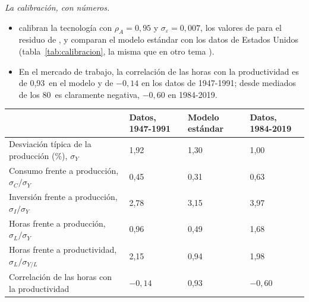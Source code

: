 \documentclass[11pt]{article}
\begin{document}
\begin{anotaciones}
\emph{La calibración, con números.}
\begin{itemize}
\item \textcite{HansenWright1992Labor} calibran la tecnología con $\rho_A=0{,}95$ y $\sigma_\varepsilon=0{,}007$, los valores de \textcite{Prescott1986} para el residuo de , y comparan el modelo estándar con los datos de Estados Unidos (tabla~\ref{tab:calibracion}, la misma que en otro tema ).
\item En el mercado de trabajo, la correlación de las horas con la productividad es de 0,93~en el modelo y de $-0{,}14$ en los datos de 1947-1991; desde mediados de los 80~es claramente negativa, $-0{,}60$ en 1984-2019\nocite{FRED2026CicloEEUU}.
\end{itemize}
\begin{tablacaja}
\caption{El ciclo de Estados Unidos y el modelo de ciclo real estándar}\label{tab:calibracion}
\small
\begin{tabular}{>{\raggedright\arraybackslash}m{5.6cm}>{\centering\arraybackslash}m{2.6cm}>{\centering\arraybackslash}m{2.3cm}>{\centering\arraybackslash}m{2.6cm}}
\toprule
\rowcolor{tceeazulpalido} & \textcolor{tceemorado}{\textbf{Datos, 1947-1991}} & \textcolor{tceeverde}{\textbf{Modelo estándar}} & \textcolor{tceeazul}{\textbf{Datos, 1984-2019}}\\
\midrule
Desviación típica de la producción (\%), $\sigma_Y$ & \textcolor{tceemorado}{1,92} & \textcolor{tceeverde}{1,30} & \textcolor{tceeazul}{1,00}\\
Consumo frente a producción, $\sigma_C/\sigma_Y$ & \textcolor{tceemorado}{0,45} & \textcolor{tceeverde}{0,31} & \textcolor{tceeazul}{0,63}\\
Inversión frente a producción, $\sigma_I/\sigma_Y$ & \textcolor{tceemorado}{2,78} & \textcolor{tceeverde}{3,15} & \textcolor{tceeazul}{3,97}\\
Horas frente a producción, $\sigma_L/\sigma_Y$ & \textcolor{tceemorado}{0,96} & \textcolor{tceeverde}{0,49} & \textcolor{tceeazul}{1,68}\\
Horas frente a productividad, $\sigma_L/\sigma_{Y/L}$ & \textcolor{tceemorado}{2,15} & \textcolor{tceeverde}{0,94} & \textcolor{tceeazul}{1,98}\\
Correlación de las horas con la productividad & \textcolor{tceemorado}{$-0{,}14$} & \textcolor{tceeverde}{0,93} & \textcolor{tceeazul}{$-0{,}60$}\\
\bottomrule
\end{tabular}

\end{tablacaja}
\end{anotaciones}
\end{document}
